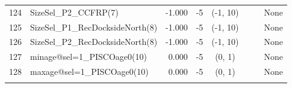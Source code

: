 \documentclass[12pt,]{article}
\begin{document}
\begin{landscape}
\begin{longtable}{rlrrcccp{1.5in}}
  124 & SizeSel\_P2\_CCFRP(7) & -1.000 & -5 & (-1, 10) &  &  & None \\ 
  125 & SizeSel\_P1\_RecDocksideNorth(8) & -1.000 & -5 & (-1, 10) &  &  & None \\ 
  126 & SizeSel\_P2\_RecDocksideNorth(8) & -1.000 & -5 & (-1, 10) &  &  & None \\ 
  127 & minage@sel=1\_PISCOage0(10) & 0.000 & -5 & (0, 1) &  &  & None \\ 
  128 & maxage@sel=1\_PISCOage0(10) & 0.000 & -5 & (0, 1) &  &  & None \\ 
   \hline
\hline
\label{tab:model_params}
\end{longtable}

\end{landscape}

\FloatBarrier
\end{document}
